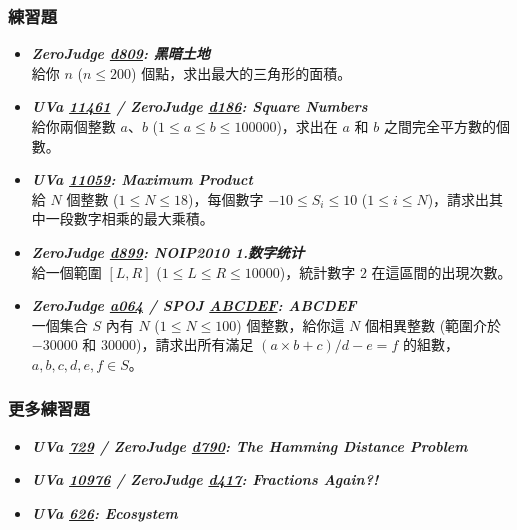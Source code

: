 \subsubsection*{練習題}
\begin{itemize}[label={\Checkmark}]
\item \textbf{\textit{ZeroJudge \href{http://zerojudge.tw/ShowProblem?problemid=d809}{d809}: 黑暗土地}}\\
給你 $n$ ($n\leq{200}$) 個點，求出最大的三角形的面積。
\item \textbf{\textit{UVa \href{http://uva.onlinejudge.org/external/114/11461.html}{11461} / ZeroJudge \href{http://zerojudge.tw/ShowProblem?problemid=d186}{d186}: Square Numbers}}\\
給你兩個整數 $a$、$b$ ($1\leq{a}\leq{b}\leq{100000}$)，求出在 $a$ 和 $b$ 之間完全平方數的個數。
\item \textbf{\textit{UVa \href{http://uva.onlinejudge.org/external/110/11059.html}{11059}: Maximum Product}}\\
給 $N$ 個整數 ($1\leq{N}\leq{18}$)，每個數字 $-10\leq{S_i}\leq{10}$ ($1\leq{i}\leq{N}$)，請求出其中一段數字相乘的最大乘積。
\item \textbf{\textit{ZeroJudge \href{http://zerojudge.tw/ShowProblem?problemid=d899}{d899}: NOIP2010 1.数字统计}}\\
給一個範圍 $[L,R]$ ($1\leq{L}\leq{R}\leq{10000}$)，統計數字 $2$ 在這區間的出現次數。
\item \textbf{\textit{ZeroJudge \href{http://zerojudge.tw/ShowProblem?problemid=a064}{a064} / SPOJ \href{http://www.spoj.com/problems/ABCDEF}{ABCDEF}: ABCDEF}}\\
一個集合 $S$ 內有 $N$ ($1\leq{N}\leq{100}$) 個整數，給你這 $N$ 個相異整數 (範圍介於 $-30000$ 和 $30000$)，請求出所有滿足 $(a\times{b}+c)/d-e=f$ 的組數，$a,b,c,d,e,f\in{S}$。
\end{itemize}
\subsubsection*{更多練習題}
\begin{itemize}[label={\PencilLeftDown}]
\item \textbf{\textit{UVa \href{http://uva.onlinejudge.org/external/7/729.html}{729} / ZeroJudge \href{http://zerojudge.tw/ShowProblem?problemid=d790}{d790}: The Hamming Distance Problem}}
\item \textbf{\textit{UVa \href{http://uva.onlinejudge.org/external/109/10976.html}{10976} / ZeroJudge \href{http://zerojudge.tw/ShowProblem?problemid=d417}{d417}: Fractions Again?!}}
\item \textbf{\textit{UVa \href{http://uva.onlinejudge.org/external/6/626.html}{626}: Ecosystem}}
\end{itemize}